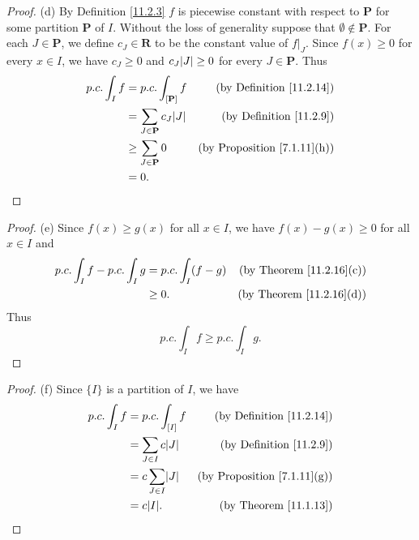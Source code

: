 \begin{proof}{(d)}
    By Definition \ref{11.2.3} \(f\) is piecewise constant with respect to \(\mathbf{P}\) for some partition \(\mathbf{P}\) of \(I\).
    Without the loss of generality suppose that \(\emptyset \notin \mathbf{P}\).
    For each \(J \in \mathbf{P}\), we define \(c_J \in \mathbf{R}\) to be the constant value of \(f|_J\).
    Since \(f(x) \geq 0\) for every \(x \in I\), we have \(c_J \geq 0\) and \(c_J \abs*{J} \geq 0\) for every \(J \in \mathbf{P}\).
    Thus
    \begin{align*}
        p.c. \int_I f & = p.c. \int_{[\mathbf{P}]} f           & \text{(by Definition \ref{11.2.14})}    \\
                      & = \sum_{J \in \mathbf{P}} c_J \abs*{J} & \text{(by Definition \ref{11.2.9})}     \\
                      & \geq \sum_{J \in \mathbf{P}} 0         & \text{(by Proposition \ref{7.1.11}(h))} \\
                      & = 0.
    \end{align*}
\end{proof}

\begin{proof}{(e)}
    Since \(f(x) \geq g(x)\) for all \(x \in I\), we have \(f(x) - g(x) \geq 0\) for all \(x \in I\) and
    \begin{align*}
        p.c. \int_I f - p.c. \int_I g & = p.c. \int_I (f - g) & \text{(by Theorem \ref{11.2.16}(c))} \\
                                      & \geq 0.               & \text{(by Theorem \ref{11.2.16}(d))}
    \end{align*}
    Thus
    \[
        p.c. \int_I f \geq p.c. \int_I g.
    \]
\end{proof}

\begin{proof}{(f)}
    Since \(\{I\}\) is a partition of \(I\), we have
    \begin{align*}
        p.c. \int_I f & = p.c. \int_{[I]} f         & \text{(by Definition \ref{11.2.14})}    \\
                      & = \sum_{J \in I} c \abs*{J} & \text{(by Definition \ref{11.2.9})}     \\
                      & = c \sum_{J \in I} \abs*{J} & \text{(by Proposition \ref{7.1.11}(g))} \\
                      & = c \abs*{I}.               & \text{(by Theorem \ref{11.1.13})}
    \end{align*}
\end{proof}

